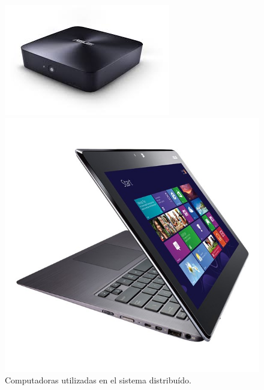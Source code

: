  \begin{figure}[H]
	\centering
	\begin{multicols}{2}
		\includegraphics[width=\textwidth,height=0.2\textheight,keepaspectratio]{img/proy/pc_asus_1}\par 
		\includegraphics[width=\textwidth,height=0.2\textheight,keepaspectratio]{img/proy/pc_asus_2}\par 
	\end{multicols}
	\caption{Computadoras utilizadas en el sistema distribuído.}
	\label{img:pcs}
\end{figure}

